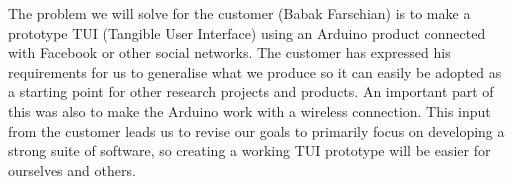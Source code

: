 The problem we will solve for the customer (Babak Farschian) is to make a prototype TUI (Tangible User Interface) using an Arduino product connected with Facebook or other social networks. The customer has expressed his requirements for us to generalise what we produce so it can easily be adopted as a starting point for other research projects and products. An important part of this was also to make the Arduino work with a wireless connection. This input from the customer leads us to revise our goals to primarily focus on developing a strong suite of software, so creating a working TUI prototype will be easier for ourselves and others.